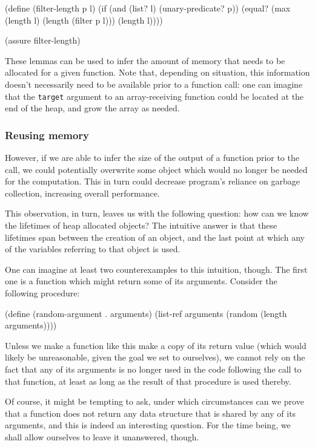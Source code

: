 \begin{Snippet}
  (define (filter-length p l)
    (if (and (list? l) (unary-predicate? p))
      (equal? (max (length l) (length (filter p l)))
              (length l))))

  (assure filter-length)
\end{Snippet}

These lemmas can be used to infer the amount of memory that needs to be
allocated for a given function. Note that, depending on situation,
this information doesn't necessarily need to be available prior to
a function call: one can imagine that the \texttt{target} argument
to an array-receiving function could be located at the end of the heap,
and grow the array as needed.

\subsubsection{Reusing memory}

However, if we are able to infer the size of the output of a function
prior to the call, we could potentially overwrite some object which 
would no longer be needed for the computation. This in turn could decrease
program's reliance on garbage collection, increasing overall
performance.

This observation, in turn, leaves us with the following question:
how can we know the lifetimes of heap allocated objects? The intuitive
answer is that these lifetimes span between the creation of an object,
and the last point at which any of the variables referring to that
object is used.

One can imagine at least two counterexamples to this intuition, though.
The first one is a function which might return some of its arguments.
Consider the following procedure:

\begin{Snippet}
  (define (random-argument . arguments)
    (list-ref arguments (random (length arguments))))
\end{Snippet}

Unless we make a function like this make a copy of its return value
(which would likely be unreasonable, given the goal we set to ourselves),
we cannot rely on the fact that any of its arguments is no longer used
in the code following the call to that function, at least as long as
the result of that procedure is used thereby.

Of course, it might be tempting to ask, under which circumstances
can we prove that a function does not return any data structure
that is shared by any of its arguments, and this is indeed an interesting
question. For the time being, we shall allow ourselves to leave it
unanswered, though.

